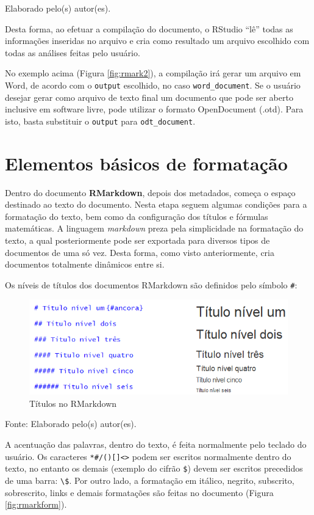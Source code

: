 \documentclass[12pt,brazil,oneside]{book}
\begin{document}
Elaborado pelo(s) autor(es).

Desta forma, ao efetuar a compilação do documento, o RStudio ``lê''
todas as informações inseridas no arquivo e cria como resultado um
arquivo escolhido com todas as análises feitas pelo usuário.

No exemplo acima (Figura \ref{fig:rmark2}), a compilação irá gerar um
arquivo em Word, de acordo com o \texttt{output} escolhido, no caso
\texttt{word\_document}. Se o usuário desejar gerar como arquivo de
texto final um documento que pode ser aberto inclusive em software
livre, pode utilizar o formato OpenDocument (.otd). Para isto, basta
substituir o \texttt{output} para \texttt{odt\_document}.

\hypertarget{elementos-basicos-de-formatacao}{%
\section{Elementos básicos de
formatação}\label{elementos-basicos-de-formatacao}}

Dentro do documento \textbf{RMarkdown}, depois dos metadados, começa o
espaço destinado ao texto do documento. Nesta etapa seguem algumas
condições para a formatação do texto, bem como da configuração dos
títulos e fórmulas matemáticas. A linguagem \emph{markdown} preza pela
simplicidade na formatação do texto, a qual posteriormente pode ser
exportada para diversos tipos de documentos de uma só vez. Desta forma,
como visto anteriormente, cria documentos totalmente dinâmicos entre si.

Os níveis de títulos dos documentos RMarkdown são definidos pelo símbolo
\texttt{\#}:

\begin{figure}[H]

{\centering \includegraphics[width=0.6\linewidth]{rmarktit} 

}

\caption{Títulos no RMarkdown}\label{fig:rmarktit}
\end{figure}

Fonte: Elaborado pelo(s) autor(es).

A acentuação das palavras, dentro do texto, é feita normalmente pelo
teclado do usuário. Os caracteres
\texttt{*\#/(){[}{]}\textless{}\textgreater{}} podem ser escritos
normalmente dentro do texto, no entanto os demais (exemplo do cifrão
\texttt{\$}) devem ser escritos precedidos de uma barra:
\texttt{\textbackslash{}\$}. Por outro lado, a formatação em itálico,
negrito, subscrito, sobrescrito, links e demais formatações são feitas
no documento (Figura \ref{fig:rmarkform}).
\end{document}

